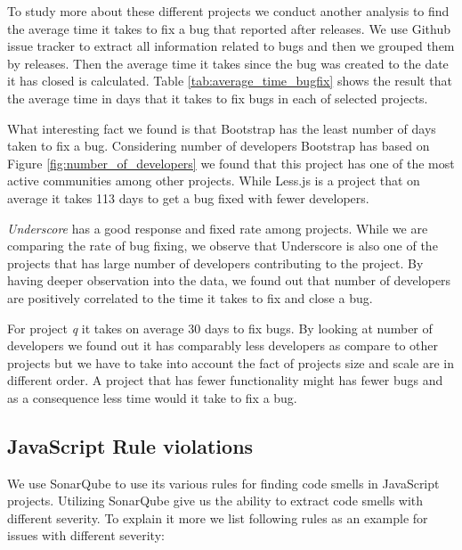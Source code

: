 To study more about these different projects we conduct another analysis to find the average time it takes to fix a bug that reported after releases. We use Github issue tracker to extract all information related to bugs and then we grouped them by releases. Then the average time it takes since the bug was created to the date it has closed is calculated. Table \ref{tab:average_time_bugfix} shows the result that the average time in days that it takes to fix bugs in each of selected projects.  
\par 
What interesting fact we found is that Bootstrap has the least number of days taken to fix a bug. Considering number of developers Bootstrap has based on Figure \ref{fig:number_of_developers} we found that this project has one of the most active communities among other projects. While Less.js is a project that on average it takes 113 days to get a bug fixed with fewer developers. 
\par
\textit{Underscore} has a good response and fixed rate among projects. While we are comparing the rate of bug fixing, we observe that Underscore is also one of the projects that has large number of developers contributing to the project. By having deeper observation into the data, we found out that number of developers are positively correlated to the time it takes to fix and close a bug.

\par For project \textit{q} it takes on average 30 days to fix bugs. By looking at number of developers we found out it has comparably less developers as compare to other projects but we have to take into account the fact of projects size and scale are in different order. A project that has fewer functionality might has fewer bugs and as a consequence less time would it take to fix a bug.

\vspace{5 mm}
\noindent{\rqiv}
\vspace{5 mm}

\subsection{JavaScript Rule violations}
We use SonarQube to use its various rules for finding code smells in JavaScript projects. Utilizing SonarQube give us the ability to extract code smells with different severity. To explain it more we list following rules as an example for issues with different severity:

